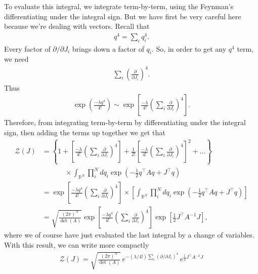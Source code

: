 \documentclass{book}
\theoremstyle{definition}
\newcommand{\p}{\partial}
\newcommand{\f}[2]{\frac{#1}{#2}}
\newcommand{\lp}{\left(}
\newcommand{\rp}{\right)}
\newcommand{\lb}{\left[}
\newcommand{\rb}{\right]}
\newcommand{\lc}{\left\{}
\newcommand{\rc}{\right\}}
\newcommand{\Z}{\mathcal{Z}}
\begin{document}
To evaluate this integral, we integrate term-by-term, using the Feynman's differentiating under the integral sign. But we have first be very careful here because we're dealing with vectors. Recall that
\begin{align}
q^4 = \sum_i q_i^4.
\end{align}
Every factor of $\p / \p J_{i}$ brings down a factor of $q_i$. So, in order to get any $q^4$ term, we need
\begin{align}
\sum_i \lp\f{\p}{\p J_i}\rp^4.
\end{align}
Thus 
\begin{align}
\exp\lp \f{-\lambda q^4}{4!} \rp \sim \exp\lb \f{-\lambda }{4!} \lp\sum_i \f{\p }{\p J_i} \rp^4\rb.
\end{align}
Therefore, from integrating term-by-term by differentiating under the integral sign, then adding the terms up together we get that
\begin{align}
\Z(J) &= \lc 1 + \lb\f{-\lambda}{4!} \lp\sum_i \f{\p }{\p J_i} \rp^4\rb + \f{1}{2!}\lb\f{-\lambda }{4!} \lp\sum_i \f{\p }{\p J_i} \rp^4\rb^2 + \dots   \rc \nonumber \\
&\,\,\,\,\,\hspace{1cm}\times\int_{\mathbb{R}^N} \prod_i^N dq_i  \exp\lp -\f{1}{2}q^\top A q + J^\top q \rp \nonumber\\
&= \exp\lb \f{-\lambda q^4}{4!} \lp\sum_i \f{\p }{\p J_i} \rp^4\rb \times \lb  \int_{\mathbb{R}^N} \prod_i^N dq_i  \exp\lp -\f{1}{2}q^\top A q + J^\top q \rp\rb \nonumber\\
&= \sqrt{\f{(2\pi)^N}{\det(A)}}\exp\lb \f{-\lambda q^4}{4!} \lp\sum_i \f{\p }{\p J_i} \rp^4\rb  \exp\lb \f{1}{2}J^\top A^{-1}J \rb,
\end{align}
where we of course have just evaluated the last integral by a change of variables. With this result, we can write more compactly
\begin{align}
\boxed{\Z(J) =  \sqrt{\f{(2\pi)^N}{\det(A)}}\, e^{-(\lambda/4!) \sum_i (\p/\p J_i)^4} \, e^{\f{1}{2}J^\top A^{-1} J}}
\end{align}
\end{document}
